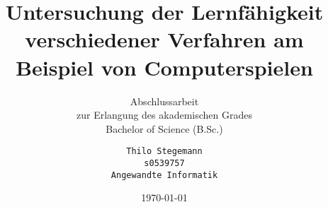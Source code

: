  
\title{
		Untersuchung der Lernfähigkeit
		verschiedener Verfahren am
		Beispiel von Computerspielen}

\subtitle{
		Abschlussarbeit\\
		zur Erlangung des akademischen Grades\\
		Bachelor of Science (B.Sc.)}

\author{
	\texttt{Thilo Stegemann}\\
	\texttt{s0539757}\\
	\texttt{Angewandte Informatik}
}

\date{\today} 

\publishers{\texttt{[image: htw\_logo]}\\
			\vspace{10mm}
			Erstprüfer: Prof. Dr. Burkhard Messer\\
			Zweitprüferin: Prof. Dr. Adrianna Alexander}

\maketitle

